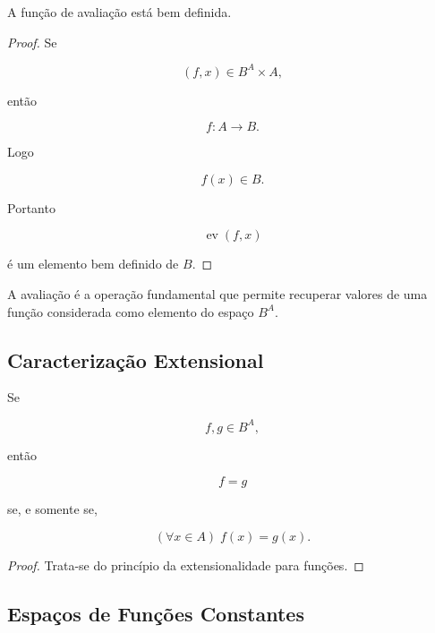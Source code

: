 \documentclass[../../main]{subfiles}
\begin{document}
\begin{prop}

	A função de avaliação está bem definida.

\end{prop}

\begin{proof}

	Se

	\[
		(f,x)
		\in
		B^A\times A,
	\]

	então

	\[
		f:A\to B.
	\]

	Logo

	\[
		f(x)\in B.
	\]

	Portanto

	\[
		\operatorname{ev}(f,x)
	\]

	é um elemento bem definido de \(B\).

\end{proof}

\begin{obs}

	A avaliação é a operação fundamental que permite recuperar valores
	de uma função considerada como elemento do espaço \(B^A\).

\end{obs}

\subsection{Caracterização Extensional}

\begin{prop}[Extensionalidade]
	\label{prop:matematica:funcoes:espacos:extensionalidade}

	Se

	\[
		f,g\in B^A,
	\]

	então

	\[
		f=g
	\]

	se, e somente se,

	\[
		(\forall x\in A)
		\;
		f(x)=g(x).
	\]

\end{prop}

\begin{proof}

	Trata-se do princípio da extensionalidade para funções.

\end{proof}

\subsection{Espaços de Funções Constantes}
\end{document}
